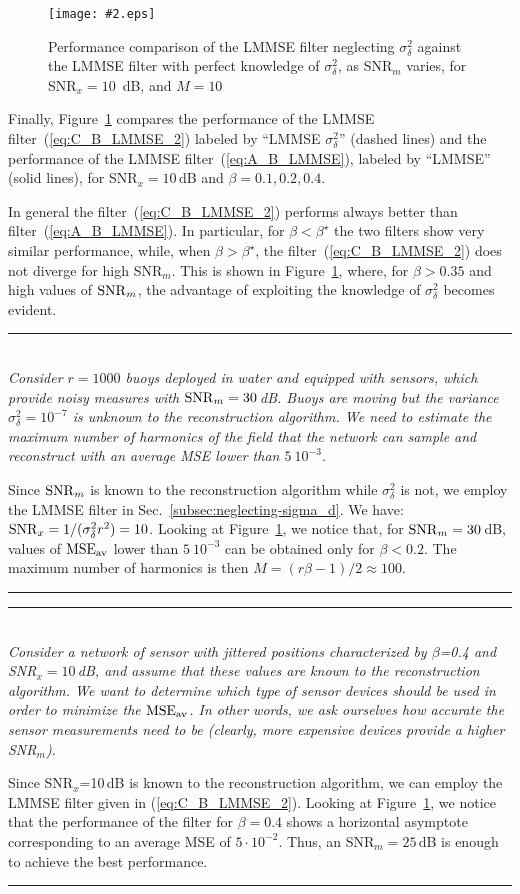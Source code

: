 \documentclass[final, a4paper]{IEEEtran}
\newcommand{\insertfig}[4]{
\begin{figure}[tbh]
\centerline{\texttt{[image: \#2.eps]}}
\vspace{-0.3cm}
\caption{#3}\label{#4}\end{figure}}
\newcommand{\example}[2]{
\begin{center}
\parbox{0.95\columnwidth}{
\rule{0.95\columnwidth}{0.5mm}\\
\noindent {\bf Example~#1:}
#2\\
\rule{0.95\columnwidth}{0.5mm}
}
\end{center}
}
\def\MSEav{{\rm MSE}_{\rm av}}
\begin{document}
\insertfig{1.00}{MSE_model_B_5}{Performance comparison of the LMMSE filter neglecting $\sigma^2_\delta$ against
the LMMSE filter with perfect knowledge of $\sigma^2_\delta$, as SNR$_m$ varies, for SNR$_x=10$~dB, and $M=10$}
{fig:MSE_model_B_5}

Finally, Figure~\ref{fig:MSE_model_B_5} compares
the performance of the LMMSE filter~(\ref{eq:C_B_LMMSE_2})
labeled by ``LMMSE $\sigma^2_\delta$'' (dashed lines) and the performance of the LMMSE filter~(\ref{eq:A_B_LMMSE}),
labeled by ``LMMSE'' (solid lines), for SNR$_x=10$\,dB and $\beta=0.1,0.2,0.4$.

In general the filter~(\ref{eq:C_B_LMMSE_2}) performs always better than filter~(\ref{eq:A_B_LMMSE}).
In particular, for $\beta<\beta^\star$ the two filters show very similar performance, while,
when $\beta>\beta^\star$,
the filter~(\ref{eq:C_B_LMMSE_2}) does not diverge for high SNR$_m$.
This is shown in Figure~\ref{fig:MSE_model_B_5},
where, for $\beta>0.35$ and high values of ${\rm SNR}_m$,
the advantage of exploiting the knowledge of $\sigma^2_\delta$
becomes evident.

\medskip
\example{2}{{\it Consider $r=1000$ buoys  deployed in water and
equipped with sensors, which provide noisy measures with ${\rm SNR}_m=30$\,dB.
Buoys are moving but the variance $\sigma^2_\delta=10^{-7}$ is unknown to the reconstruction algorithm.
We need to estimate the maximum number of harmonics of the field that the network can sample and reconstruct
with an average MSE lower than $5~10^{-3}$.
}

Since  ${\rm SNR}_m$ is known to the reconstruction algorithm
while $\sigma^2_\delta$ is not, we employ the LMMSE filter in Sec.~\ref{subsec:neglecting-sigma_d}.
We have: ${\rm SNR}_x=1/(\sigma^2_\delta r^2)=10$. Looking at
Figure~\ref{fig:MSE_model_B_5}, we notice that, for ${\rm
SNR}_m=30$\,dB, values of $\MSEav$ lower than $5~10^{-3}$ can be
obtained only for $\beta<0.2$. The maximum number of harmonics is
then $M=(r\beta-1)/2\approx 100$.
} 

\medskip
\example{3}{ {\it Consider a  network of sensor with jittered positions
characterized by $\beta$=0.4 and {\rm SNR}$_x=10$\,dB, and assume that
these values are known to the reconstruction algorithm. We want to
determine which type of sensor devices should be used  in order to
minimize the $\MSEav$. In other words, we ask ourselves how accurate
the sensor measurements need to be (clearly, more expensive devices
provide a higher {\rm SNR}$_m$). }

Since SNR$_x$=10\,dB is known to the reconstruction algorithm, we
can employ the LMMSE filter given in (\ref{eq:C_B_LMMSE_2}). Looking
at Figure~\ref{fig:MSE_model_B_5}, we notice that the performance of
the filter for $\beta=0.4$ shows a horizontal asymptote
corresponding to an average MSE of $5\cdot 10^{-2}$. Thus, an SNR$_m
= 25$\,dB is enough to achieve the best performance.
} 
\end{document}
